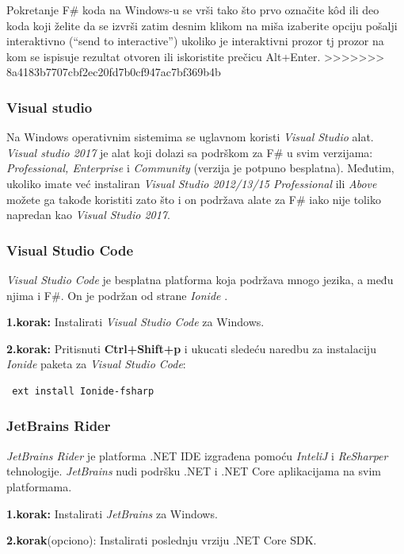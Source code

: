 \documentclass[a4paper]{article}
\begin{document}
Pokretanje F\# koda na Windows-u se vrši tako što prvo označite kôd ili deo koda koji želite da se izvrši zatim desnim klikom na miša izaberite opciju pošalji interaktivno (“send to interactive”) ukoliko je interaktivni prozor tj prozor na kom se ispisuje rezultat otvoren ili iskoristite prečicu Alt+Enter.
>>>>>>> 8a4183b7707cbf2ec20fd7b0cf947ac7bf369b4b

\subsubsection{Visual studio}
	
Na Windows operativnim sistemima se uglavnom koristi {\em Visual Studio} alat. {\em Visual studio 2017} je alat koji dolazi sa podrškom za F\# u svim verzijama: {\em Professional, Enterprise} i {\em Community} (verzija je potpuno besplatna). Međutim, ukoliko imate  već instaliran {\em Visual Studio 2012/13/15  Professional} ili {\em Above} možete ga takođe koristiti zato što i on podržava alate za F\# iako nije toliko napredan kao {\em Visual Studio 2017}.

\subsubsection{Visual Studio Code}
	
{\em Visual Studio Code} je besplatna platforma koja podržava mnogo jezika, a među njima i F\#. On je podržan od strane {\em Ionide} \cite{ionide}.

\textbf{1.korak:} Instalirati {\em Visual Studio Code} za Windows.

\textbf{2.korak:} Pritisnuti \textbf{Ctrl+Shift+p} i ukucati sledeću naredbu za instalaciju {\em Ionide} paketa za {\em Visual Studio Code}:
\\
\begin{lstlisting}
 ext install Ionide-fsharp
\end{lstlisting}
 
\subsubsection{JetBrains Rider}

{\em JetBrains Rider} je platforma .NET IDE izgrađena pomoću {\em InteliJ} i {\em ReSharper} tehnologije. {\em JetBrains} nudi podršku .NET i .NET Core aplikacijama na svim platformama.

\textbf{1.korak:} Instalirati {\em JetBrains} za Windows.

\textbf{2.korak}(opciono): Instalirati poslednju vrziju .NET Core SDK.
\end{document}
